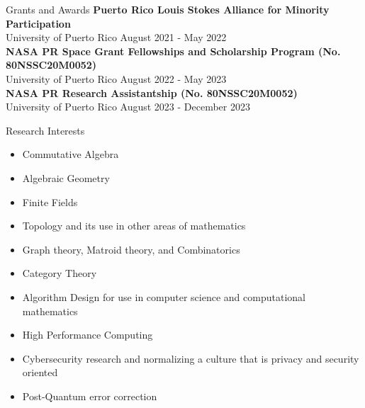 \documentclass{resume} %
\begin{document}
\begin{rSection}{Grants and Awards}
    \textbf{Puerto Rico Louis Stokes Alliance for Minority Participation} \\
    University of Puerto Rico \hfill{August 2021 - May 2022} \\

    \textbf{NASA PR Space Grant Fellowships and Scholarship Program (No.
    80NSSC20M0052)} \\
    University of Puerto Rico \hfill{August 2022 - May 2023}    \\

    \textbf{NASA PR Research Assistantship (No.
    80NSSC20M0052)} \\
    University of Puerto Rico \hfill{August 2023 - December 2023}    \\

\end{rSection}


\begin{rSection}{Research Interests}
    \begin{multicols}{2}
    \begin{itemize}
        \item Commutative Algebra

        \item Algebraic Geometry

        \item Finite Fields

        \item Topology and its use in other areas of mathematics

        \item Graph theory, Matroid theory, and Combinatorics

        \item Category Theory

        \item Algorithm Design for use in computer science and computational
            mathematics

        \item High Performance Computing

        \item Cybersecurity research and normalizing a culture that is privacy
            and security oriented

        \item Post-Quantum error correction
    \end{itemize}
    \end{multicols}
\end{rSection}
\end{document}
